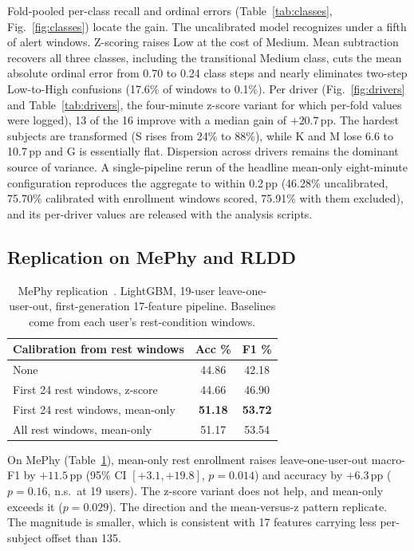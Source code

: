 \documentclass[journal]{IEEEtran}
\newcommand{\pp}{\,pp}
\begin{document}
Fold-pooled per-class recall and ordinal errors (Table~\ref{tab:classes},
Fig.~\ref{fig:classes}) locate the gain. The uncalibrated model recognizes
under a fifth of alert windows. Z-scoring raises Low at the cost of Medium.
Mean subtraction recovers all three classes, including the transitional
Medium class, cuts the mean absolute ordinal error from 0.70 to 0.24 class
steps and nearly eliminates two-step Low-to-High confusions (17.6\% of windows
to 0.1\%). Per driver (Fig.~\ref{fig:drivers} and Table~\ref{tab:drivers}, the
four-minute z-score variant for which per-fold values were logged), 13 of the 16 improve with a
median gain of $+20.7$\pp. The hardest subjects are transformed (S rises from
24\% to 88\%), while K and M lose 6.6 to 10.7\pp{} and G is essentially flat.
Dispersion across drivers remains the dominant source of variance.
A single-pipeline rerun of the headline mean-only eight-minute configuration
reproduces the aggregate to within 0.2\pp{} (46.28\% uncalibrated, 75.70\%
calibrated with enrollment windows scored, 75.91\% with them excluded), and its
per-driver values are released with the analysis scripts.

\subsection{Replication on MePhy and RLDD}
\label{sec:replication}
\begin{table}[!t]
\caption{MePhy replication~\cite{zendehbad2025fatiguenet}. LightGBM, 19-user
leave-one-user-out, first-generation 17-feature pipeline. Baselines come from
each user's rest-condition windows.}
\label{tab:mephy}
\centering\footnotesize
\begin{tabular}{@{}lcc@{}}
\toprule
Calibration from rest windows & Acc \% & F1 \% \\
\midrule
None                              & 44.86 & 42.18 \\
First 24 rest windows, z-score    & 44.66 & 46.90 \\
First 24 rest windows, mean-only  & \textbf{51.18} & \textbf{53.72} \\
All rest windows, mean-only       & 51.17 & 53.54 \\
\bottomrule
\end{tabular}
\end{table}

On MePhy (Table~\ref{tab:mephy}), mean-only rest enrollment raises
leave-one-user-out macro-F1 by $+11.5$\pp{} (95\% CI $[+3.1,+19.8]$,
$p=0.014$) and accuracy by $+6.3$\pp{} ($p=0.16$, n.s.\ at 19 users). The
z-score variant does not help, and mean-only exceeds it ($p=0.029$). The
direction and the mean-versus-z pattern replicate. The magnitude is smaller,
which is consistent with 17 features carrying less per-subject offset than
135.
\end{document}

